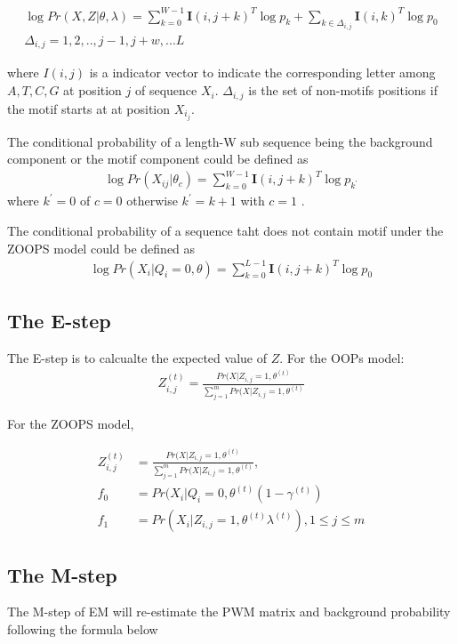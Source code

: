 \documentclass{article}
\begin{document}
\begin{equation}
\begin{split}
\log{Pr(X,Z|\theta,\lambda)}=\sum_{k=0}^{W-1}\textbf{I}(i,j+k)^T\log{p_k}+\sum_{k\in\Delta_{i,j}}\textbf{I}(i,k)^T\log{p_0}\\
\Delta_{i,j}  = {1,2,..,j-1,j+w,...L}
\end{split}
\end{equation}

where ${I}(i,j)$ is a indicator vector to indicate the corresponding letter among ${A,T,C,G}$ at position $j$ of sequence $X_i$.  $\Delta_{i,j}$  is the set of non-motifs positions if the motif starts at at position $X_i_j$.

The conditional probability of a length-W sub sequence being the background component or the motif component could be defined as
\begin{align}
\log{Pr(X_{ij}|\theta_c)}=\sum_{k=0}^{W-1}\textbf{I}(i,j+k)^T\log{p_{k^{'}}}\end{align}
where $k^{'}=0$ of $c=0$ otherwise $k^{'}=k+1$ with  $c=1$ . 

The conditional probability of a sequence taht does not contain motif under the ZOOPS model could be defined as
\begin{align}
\log{Pr(X_{i}|Q_i=0,\theta)}=\sum_{k=0}^{L-1}\textbf{I}(i,j+k)^T\log{p_{0}}\end{align}
\subsection{The E-step}
The E-step is to calcualte the expected value of $Z$. For the OOPs model:
\begin{align}
Z^{(t)}_{i,j}=\frac{Pr(X|Z_{i,j}=1,\theta^{(t)}}{\sum_{j=1}^{m}Pr(X|Z_{i,j}=1,\theta^{(t)}}
\end{align}

For the ZOOPS model,

\begin{align}
Z^{(t)}_{i,j}&=\frac{Pr(X|Z_{i,j}=1,\theta^{(t)}}{\sum_{j=1}^{m}Pr(X|Z_{i,j}=1,\theta^{(t)}},\\
f_0&=Pr(X_i|Q_{i}=0,\theta^{(t)}(1-\gamma^{(t)}) \\
f_1&=Pr(X_i|Z_{i,j}=1,\theta^{(t)}\lambda^{(t)}), 1\leq j\leq m
\end{align}

\subsection{The M-step}
The M-step of EM will re-estimate the PWM matrix and background probability following the formula below
\end{document}
